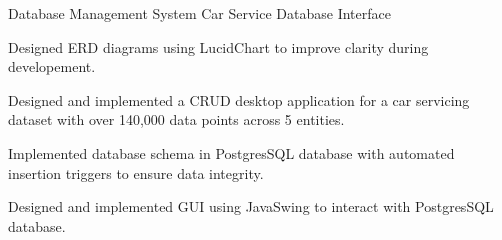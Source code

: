 \cventry
{Database Management System} %
{Car Service Database Interface} %
{\href{https://github.com/giathuan123/cs166-project}{\faGithubSquare}} %
{\diJavaPlain \diPostgresqlPlain } %
{
	\begin{cvitems} %
		\item Designed ERD diagrams using LucidChart to improve clarity during developement.
		\item Designed and implemented a CRUD desktop application for a car servicing dataset
		with over 140,000 data points across 5 entities.
		\item Implemented database schema in PostgresSQL database with automated insertion
		triggers to ensure data integrity.
		\item Designed and implemented GUI using JavaSwing to interact with PostgresSQL
		database.
	\end{cvitems}
}
